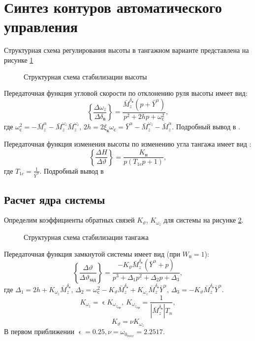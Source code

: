 \section{Синтез контуров автоматического управления}
Структурная схема регулирования высоты в тангажном варианте представлена на рисунке \ref{fig:fig_51}
\begin{figure}[H]
	\centering
    \caption{Структурная схема стабилизации высоты}
	\label{fig:fig_51}
\end{figure}

Передаточная функция угловой скорости по отклонению руля высоты имеет вид:
\begin{equation}
    \left\{\frac{\Delta \omega_z}{\Delta \delta_\text{в}} \right\} = \frac{\bar{M}_z^{\delta_\text{в}}(p + \bar{Y}^\alpha)}{p^2 + 2hp + \omega_{\text{с}}^2}, \label{eq:d_w_d_d}
\end{equation}
где $\omega_{\text{с}}^2= -\bar{M}_z^\alpha - \bar{M}_z^{\omega_z}\bar{M}_z^{\omega_z} $, $2h = 2\xi_{\text{к}} \omega_{\text{с}} = \bar{Y}^\alpha - \bar{M}_z^{\omega_z} - \bar{M}_z^{\dot{\alpha}}$. Подробный вывод в \cite[c.498]{DP_efremov}.

Передаточная функция изменения высоты по изменению угла тангажа имеет вид :
\begin{equation}
    \left\{ \frac{\Delta H}{\Delta \vartheta} \right\} = \frac{K_\text{н}}{p(T_{1c}p +1)}, \label{eq:d_H_d_t}
\end{equation}
где $T_{1c} = \frac{1}{\bar{Y}^\alpha}$. Подробный вывод в \cite[c.61]{control_book}


\subsection{Расчет ядра системы}
Определим коэффициенты обратных связей $K_\vartheta$, $K_{\omega_z}$ для системы на рисунке \ref{fig:core_scheme}.
\begin{figure}[H]
	\centering
    \caption{Структурная схема стабилизации тангажа}
	\label{fig:core_scheme}
\end{figure}

Передаточная функция замкнутой системы имеет вид (при $W_п = 1$):
\begin{equation}
    \left\{ \frac{\Delta \vartheta}{\Delta \vartheta_{зад}} \right\} = \frac{-K_\vartheta \bar{M}_z^{\delta_в}(\bar{Y}^\alpha + p)}{p^3 + \Delta_1 p^2 + \Delta_2 p + \Delta_3},
    \label{eq:W_theta_cl}
\end{equation}
где $\Delta_1 = 2h + K_{\omega_z}\bar{M}_z^{\delta_в}$, $\Delta_2 = \omega_с^2 - K_\vartheta \bar{M}_z^{\delta_в} + K_{\omega_z}\bar{M}_z^{\delta_в}\bar{Y}^\alpha$, $\Delta_3 = -K_\vartheta \bar{M}_z^{\delta_в} \bar{Y}^\alpha$. 
\[
    K_{\omega_z} = \upvarepsilon K_{{\omega_z}_{\text{гр}}}, \ K_{{\omega_z}_{\text{гр}}} = \frac{1}{|\bar{M}_z^{\delta_\text{в}}| T_n},
\]
\[
    K_\vartheta = \nu K_{\omega_z}
\]
В первом приближении $\upvarepsilon = 0.25, \nu = \omega_{0_{max}}=2.2517$.

